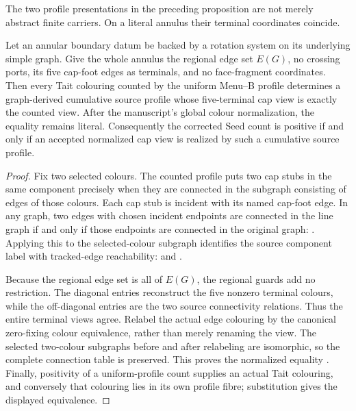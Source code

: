 The two profile presentations in the preceding proposition are not merely
abstract finite carriers.  On a literal annulus their terminal coordinates
coincide.

\begin{proposition}
\label{prop:annular-terminal-profile-realization}
Let an annular boundary datum be backed by a rotation system on its underlying
simple graph.  Give the whole annulus the regional edge set $E(G)$, no crossing
ports, its five cap-foot edges as terminals, and no face-fragment coordinates.
Then every Tait colouring counted by the uniform Menu--B profile determines a
graph-derived cumulative source profile whose five-terminal cap view is
exactly the counted view.  After the manuscript's global colour normalization,
the equality remains literal.  Consequently the corrected Seed count is
positive if and only if an accepted normalized cap view is realized by such a
cumulative source profile.
\end{proposition}

\begin{proof}
Fix two selected colours.  The counted profile puts two cap stubs in the same
component precisely when they are connected in the subgraph consisting of
edges of those colours.  Each cap stub is incident with its named cap-foot
edge.  In any graph, two edges with chosen incident endpoints are connected
in the line graph if and only if those endpoints are connected in the
original graph:
.
Applying this to the selected-colour subgraph identifies the source component
label with tracked-edge reachability:
and
.

Because the regional edge set is all of $E(G)$, the regional guards add no
restriction.  The diagonal entries reconstruct the five nonzero terminal
colours, while the off-diagonal entries are the two source connectivity
relations.  Thus the entire terminal views agree.  Relabel the actual edge
colouring by the canonical zero-fixing colour equivalence, rather than merely
renaming the view.  The selected two-colour subgraphs before and after
relabeling are isomorphic, so the complete connection table is preserved.
This proves the normalized equality
.
Finally, positivity of a uniform-profile count supplies an actual Tait
colouring, and conversely that colouring lies in its own profile fibre;
substitution gives the displayed equivalence.
\end{proof}

